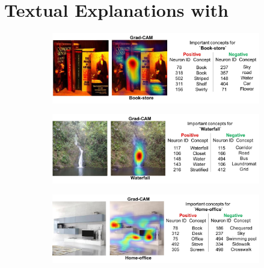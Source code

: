 \vspace{-10pt}
\section{Textual Explanations with \gcam{}}\label{sec:text_exp}

\begin{figure}[h]
\begin{center}
\begin{subfigure}[t]{\columnwidth}
\includegraphics[scale=0.135]{figures/1_pos.jpg}\caption{}
\vspace{10pt}
\end{subfigure}
\begin{subfigure}[t]{\columnwidth}
\includegraphics[scale=0.135]{figures/2_pos.jpg}\caption{}
\vspace{10pt}
\end{subfigure}
\begin{subfigure}[t]{\columnwidth}
\includegraphics[scale=0.135]{figures/3_pos.jpg}\caption{}
\vspace{10pt}
\end{subfigure}
\begin{subfigure}[t]{\columnwidth}

\end{subfigure}
\end{center}
\end{figure}
